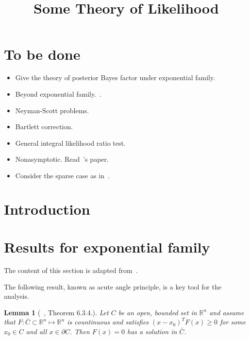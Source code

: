 \documentclass[11pt, letterpaper]{article}
\theoremstyle{plain}
\newtheorem{lemma}{\quad\quad Lemma}
\theoremstyle{definition}
\theoremstyle{remark}
\begin{document}
\title{Some Theory of Likelihood}
\maketitle
\section{To be done}
\begin{itemize}
    \item
        Give the theory of posterior Bayes factor under exponential family.
    \item
        Beyond exponential family.~\citep{berger2003approximations}.
    \item
        Neyman-Scott problems.
    \item
        Bartlett correction.
    \item
    General integral likelihood ratio test.
    \item
        Nonasymptotic. Read~\cite{spokoiny2012parametric}'s paper.
    \item
    Consider the sparse case as in~\cite{stadler2016two}.
\end{itemize}
\section{Introduction}

\section{Results for exponential family}
The content of this section is adapted from~\cite{Ghosal2000Asymptotic}.

The following result, known as acute angle principle, is a key tool for the analysis.
\begin{lemma}[~\cite{book:263774}, Theorem 6.3.4.]\label{acute}
    Let $C$ be an open, bounded set in $\mathbb{R}^n$ and assume that $F:\bar{C}\subset \mathbb{R}^n \mapsto \mathbb{R}^n$ is countinuous and satisfies $(x-x_0)^T F(x)\geq 0$ for some $x_0\in C$ and all $x\in \partial C$. Then $F(x)=0$ has a solution in $\bar{C}$.
\end{lemma}
\end{document}
